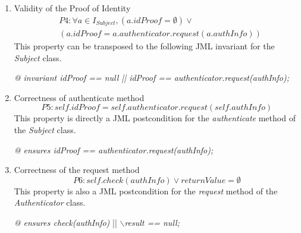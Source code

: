 \begin{enumerate}
    \item Validity of the Proof of Identity
    \begin{equation*}
    \begin{split}
        &P4: \forall a \in I_{Subject}, (a.idProof = \emptyset) \lor \\&(a.idProof = a.authenticator.request(a.authInfo))
    \end{split}
    \end{equation*}
    This property can be transposed to the following JML invariant for the \textit{Subject} class.
    \begin{center}
        \textit{@ invariant idProof == null || idProof == authenticator.request(authInfo);}
    \end{center}
    
    \item Correctness of authenticate method
    \begin{equation*}
        P5: self.idProof = self.authenticator.request(self.authInfo)
    \end{equation*}
    This property is directly a JML postcondition for the \textit{authenticate} method of the \textit{Subject} class.
    \begin{center}
        \textit{@ ensures idProof == authenticator.request(authInfo);}
    \end{center}
    
    \item Correctness of the request method
    \begin{equation*}
        P6: self.check(authInfo) \lor returnValue = \emptyset
    \end{equation*}
    This property is also a JML postcondition for the \textit{request} method of the \textit{Authenticator} class.
     \begin{center}
        \textit{@ ensures check(authInfo)} || \textit{$\backslash$result == null;}
    \end{center}
\end{enumerate}

